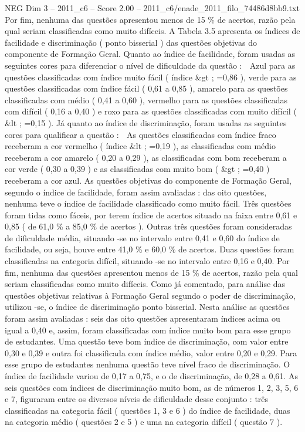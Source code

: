 \begin{textsample}{NEG Dim 3 – 2011\_c6 – Score 2.00 – 2011\_c6/enade\_2011\_filo\_74486d8bb9.txt}
Por fim, nenhuma das questões apresentou menos de 15 \% de acertos, razão pela qual seriam classificadas como muito difíceis.
A Tabela 3.5 apresenta os índices de facilidade e discriminação ( ponto bisserial ) das questões objetivas do componente de Formação Geral.
Quanto ao índice de facilidade, foram usadas as seguintes cores para diferenciar o nível de dificuldade da questão :  Azul para as questões classificadas com índice muito fácil ( índice \&gt ; =0,86 ), verde para as questões classificadas com índice fácil ( 0,61 a 0,85 ), amarelo para as questões classificadas com médio ( 0,41 a 0,60 ), vermelho para as questões classificadas com difícil ( 0,16 a 0,40 ) e roxo para as questões classificadas com muito difícil ( \&lt ; =0,15 ).
Já quanto ao índice de discriminação, foram usadas as seguintes cores para qualificar a questão :  As questões classificadas com índice fraco receberam a cor vermelho ( índice \&lt ; =0,19 ), as classificadas com médio receberam a cor amarelo ( 0,20 a 0,29 ), as classificadas com bom receberam a cor verde ( 0,30 a 0,39 ) e as classificadas com muito bom ( \&gt ; =0,40 ) receberam a cor azul.
As questões objetivas do componente de Formação Geral, segundo o índice de facilidade, foram assim avaliadas : das oito questões, nenhuma teve o índice de facilidade classificado como muito fácil.
Três questões foram tidas como fáceis, por terem índice de acertos situado na faixa entre 0,61 e 0,85 ( de 61,0 \% a 85,0 \% de acertos ).
Outras três questões foram consideradas de dificuldade média, situando -se no intervalo entre 0,41 e 0,60 do índice de facilidade, ou seja, houve entre 41,0 \% e 60,0 \% de acertos.
Duas questões foram classificadas na categoria difícil, situando -se no intervalo entre 0,16 e 0,40.
Por fim, nenhuma das questões apresentou menos de 15 \% de acertos, razão pela qual seriam classificadas como muito difíceis.
Como já comentado, para análise das questões objetivas relativas à Formação Geral segundo o poder de discriminação, utilizou -se, o índice de discriminação ponto bisserial.
Nesta análise as questões foram assim avaliadas : seis das oito questões apresentaram índices acima ou igual a 0,40 e, assim, foram classificadas com índice muito bom para esse grupo de estudantes.
Uma questão teve bom índice de discriminação, com valor entre 0,30 e 0,39 e outra foi classificada com índice médio, valor entre 0,20 e 0,29.
Para esse grupo de estudantes nenhuma questão teve nível fraco de discriminação.
O índice de facilidade variou de 0,17 a 0,75, e o de discriminação, de 0,28 a 0,61.
As seis questões com índices de discriminação muito bom, as de números 1, 2, 3, 5, 6 e 7, figuraram entre os diversos níveis de dificuldade desse conjunto : três classificadas na categoria fácil ( questões 1, 3 e 6 ) do índice de facilidade, duas na categoria médio ( questões 2 e 5 ) e uma na categoria difícil ( questão 7 ).

\end{textsample}
